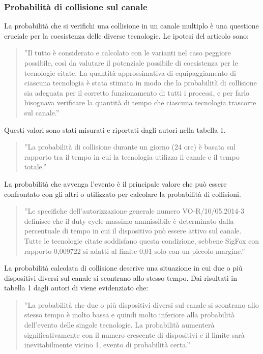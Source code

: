 \documentclass[a4paper]{report} %
\begin{document}
\subsubsection{Probabilità di collisione sul canale}
La probabilità che si verifichi una collisione in un canale multiplo è una questione cruciale per la coesistenza delle diverse tecnologie. Le ipotesi del articolo \cite{art:rif.46} sono:
\begin{quote}
	''Il tutto è considerato e calcolato con le varianti nel caso peggiore possibile, così da valutare il potenziale possibile di coesistenza per le tecnologie citate. La quantità approssimativa di equipaggiamento di ciascuna tecnologia è stata stimata in modo che la probabilità di collisione sia adeguata per il corretto funzionamento di tutti i processi, e per farlo bisognava verificare la quantità di tempo che ciascuna tecnologia trascorre sul canale.''
\end{quote}
Questi valori sono stati misurati e riportati dagli autori nella tabella 1. 
\begin{quote}
	''La probabilità di collisione durante un giorno (24 ore) è basata sul rapporto tra il tempo in cui la tecnologia utilizza il canale e il tempo totale.''
\end{quote}
La probabilità che avvenga l'evento è il principale valore che può essere confrontato con gli altri o utilizzato per calcolare la probabilità di collisioni. 
\begin{quote}
	''Le specifiche dell'autorizzazione generale numero VO-R/10/05.2014-3  definisce che il duty cycle massimo ammissibile è determinato dalla percentuale di tempo in cui il dispositivo può essere attivo sul canale. 
	Tutte le tecnologie citate soddisfano questa condizione, sebbene SigFox con rapporto 0,009722 si adatti al limite 0,01 solo con un piccolo margine.''
\end{quote}
La probabilità calcolata di collisione descrive una situazione in cui due o più dispositivi diversi sul canale si scontrano allo stesso tempo. Dai risultati in tabella 1 dagli autori di \cite{art:rif.46} viene evidenziato che: 
\begin{quote}
	''La probabilità che due o più dispositivi diversi sul canale si scontrano allo stesso tempo è molto bassa e quindi molto inferiore alla probabilità dell'evento delle singole tecnologie. La probabilità aumenterà significativamente con il numero crescente di dispositivi e il limite sarà inevitabilmente vicino 1, evento di probabilità certa.''
\end{quote}
\end{document}
